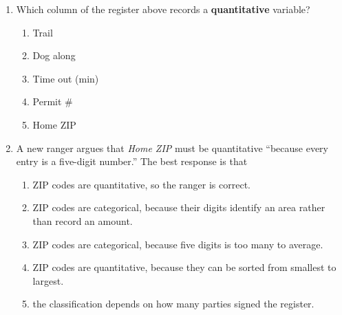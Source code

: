 \documentclass[12pt]{article}
\begin{document}
\vspace{0.10in}

\begin{enumerate}[leftmargin=1.9em, itemsep=0.14in]

  \item Which column of the register above records a \textbf{quantitative} variable?
        \begin{enumerate}[label=\textbf{(\Alph*)}, leftmargin=2.2em, itemsep=3pt]
          \item Trail
          \item Dog along
          \item Time out (min)
          \item Permit \#
          \item Home ZIP
                \hfill{}
        \end{enumerate}

  \boxguard[10]
  \item A new ranger argues that \emph{Home ZIP} must be quantitative ``because every entry is
        a five-digit number.'' The best response is that
        \begin{enumerate}[label=\textbf{(\Alph*)}, leftmargin=2.2em, itemsep=3pt]
          \item ZIP codes are quantitative, so the ranger is correct.
          \item ZIP codes are categorical, because their digits identify an area rather than
                record an amount.
          \item ZIP codes are categorical, because five digits is too many to average.
          \item ZIP codes are quantitative, because they can be sorted from smallest to largest.
          \item the classification depends on how many parties signed the register.
                \hfill{}
        \end{enumerate}


\end{enumerate}
\end{document}
